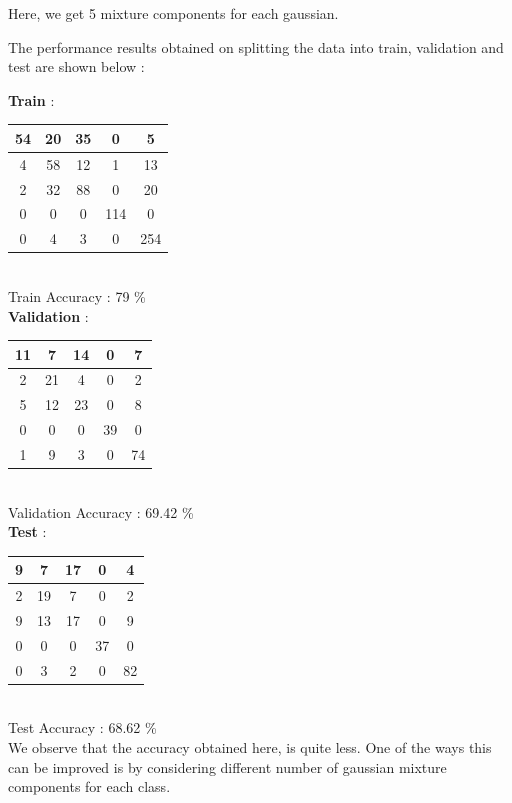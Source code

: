 \documentclass{article}
\begin{document}
\begin{flushleft}

Here, we get 5 mixture components for each gaussian. 

The performance results obtained on splitting the data into train, validation and test are shown below :

\textbf{Train} : \\[10pt]


\begin{tabular}{|c|c|c|c|c|} \hline 54 & 20 & 35 & 0 & 5\\ \hline 4 & 58 & 12 & 1 & 13\\ \hline 2 & 32 & 88 & 0 & 20\\ \hline 0 & 0 & 0 & 114 & 0\\ \hline 0 & 4 & 3 & 0 & 254 \\ \hline \end{tabular}\\[10pt]

Train Accuracy : 79 \% \\[10pt]

\textbf{Validation} :  \\[10pt]
\begin{tabular}{|c|c|c|c|c|} \hline 11 & 7 & 14 & 0 & 7\\ \hline 2 & 21 & 4 & 0 & 2\\ \hline 5 & 12 & 23 & 0 & 8\\ \hline 0 & 0 & 0 & 39 & 0\\ \hline 1 & 9 & 3 & 0 & 74 \\ \hline \end{tabular}\\[10pt]

Validation Accuracy : 69.42  \% \\[10pt]
\textbf{Test} :  \\[10pt]
\begin{tabular}{|c|c|c|c|c|}  \hline 9 & 7 & 17 & 0 & 4\\ \hline 2 & 19 & 7 & 0 & 2\\ \hline 9 & 13 & 17 & 0 & 9\\ \hline 0 & 0 & 0 & 37 & 0\\ \hline 0 & 3 & 2 & 0 & 82 \\ \hline \end{tabular}\\[10pt]

Test Accuracy : 68.62 \% \\[10pt]


We observe that the accuracy obtained here, is quite less. One of the ways this can be improved is by considering different number of gaussian mixture components for each class. \\[10pt]



\end{flushleft}
\end{document}
